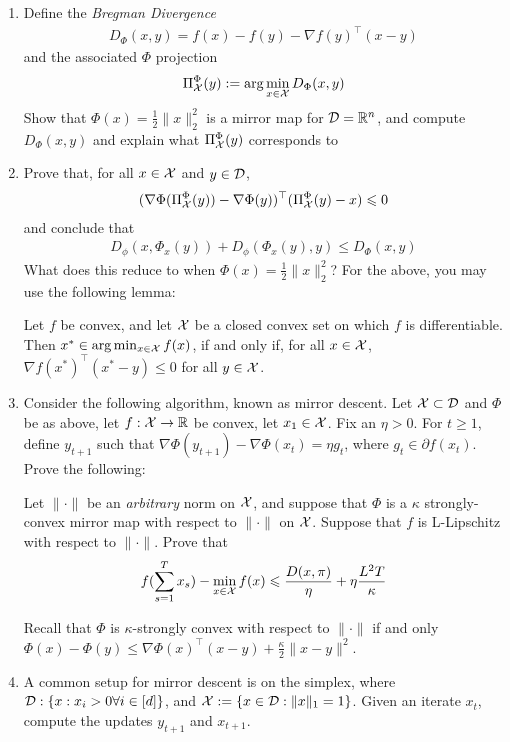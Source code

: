 \documentclass[12pt]{article}
\begin{document}
\begin{enumerate}
\item
Define the \emph{Bregman Divergence}
\begin{eqnarray}
D_{\Phi}(x,y) = f(x) - f(y) - \nabla f(y)^{\top}(x-y)
\end{eqnarray}
and the associated $\Phi$ projection
\begin{eqnarray}
\Pi_{{\cal X}}^{\Phi}(y):= \arg\min_{x \in {\cal X}} D_{\Phi}(x,y)
\end{eqnarray}
Show that $\Phi(x) = \frac{1}{2}\|x\|^2_2$ is a mirror map for ${\cal D} = \mathbb{R}^n$, and compute $D_{\Phi}(x,y)$ and explain what $\Pi_{{\cal X}}^{\Phi}(y)$ corresponds to
\item
Prove that, for all $x \in {\cal X}$ and $y \in {\cal D}$,
\begin{eqnarray}
(\nabla \Phi(\Pi_{{\cal X}}^{\Phi}(y)) - \nabla \Phi(y))^\top(\Pi_{{\cal X}}^{\Phi}(y) - x) \leqslant 0
\end{eqnarray}
and conclude that
\begin{eqnarray}
D_{\phi}(x,\Phi_{x}(y)) + D_{\phi}(\Phi_{x}(y),y) \le D_{\Phi}(x,y) 
\end{eqnarray}
What does this reduce to when $\Phi(x) = \frac{1}{2}\|x\|^2_2$? For the above, you may use the following lemma:
\begin{lemma*} Let $f$ be convex, and let ${\cal X}$ be a closed convex set on which $f$ is differentiable. Then $x^* \in \arg\min_{x \in {\cal X}} f(x)$, if and only if, for all $x \in {\cal X}$, $\nabla f(x^*)^\top ( x^* - y) \le 0$ for all $y \in {\cal X}$.
\end{lemma*}
\item
Consider the following algorithm, known as mirror descent. Let ${\cal X} \subset {\cal D}$ and $\Phi$ be as above, let $f: {\cal X} \to \mathbb{R}$ be convex, let $x_1  \in {\cal X}$. Fix an $\eta > 0$. For $t \ge 1$, define $y_{t+1}$ such that $\nabla \Phi(y_{t+1}) - \nabla \Phi(x_{t}) = \eta g_t$, where $g_t \in \partial f(x_t)$. Prove the following:
\begin{theorem*} Let $\|\cdot\|$ be an \emph{arbitrary} norm on ${\cal X}$, and suppose that $\Phi$ is a $\kappa$ strongly-convex mirror map with respect to $\|\cdot\|$ on ${\cal X}$. Suppose that $f$ is L-Lipschitz with respect to $\|\cdot\|$. Prove that 
\begin{eqnarray}
f(\sum_{s=1}^T x_s) - \min_{x \in {\cal X}} f(x) \leqslant \frac{D(x,\pi)}{\eta} + \eta \frac{L^2 T}{\kappa}
\end{eqnarray}
\end{theorem*}
Recall that $\Phi$ is $\kappa$-strongly convex with respect to $\|\cdot\|$ if and only $\Phi(x)  - \Phi(y) \le \nabla \Phi(x)^\top (x-y) + \frac{\kappa}{2}\|x-y\|^2$. 
\item
A common setup for mirror descent is on the simplex, where ${\cal D}: \{x: x_i > 0 \forall i \in [d]\}$, and ${\cal X} := \{x \in {\cal D}:\|x\|_1 = 1\}$. Given an iterate $x_t$, compute the updates $y_{t+1}$ and $x_{t+1}$. 
\end{enumerate}
\newpage
\end{document}
